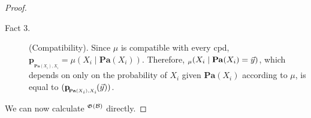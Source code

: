 \documentclass{article}
\theoremstyle{plain}
\theoremstyle{definition}
\theoremstyle{remark}
\let\H\relax
\DeclareMathOperator{\H}{\mathrm{H}} %
\newcommand\mat[1]{\mathbf{#1}}
\newcommand{\bp}[1][L]{\mat{p}_{\!_{#1}\!}}
\newcommand{\dg}[1]{\mathfrak{#1}}
\newcommand\Pa{\mathbf{Pa}}
\newcommand\Gib{\mathit{Gib}}
\newcommand\extrainfo[2][\dg M]{\Gib(#1,#2)}
\newcommand{\PDGof}[1]{\dg G(#1)}
\numberwithin{equation}{section}
\begin{document}
\begin{proof}
\begin{description}
			\item[Fact 3.] (Compatibility). Since $\mu$ is compatible with every cpd, $\bp[\Pa(X_i),X_i] = \mu(X_i \mid \Pa(X_i))$. Therefore, $\H_\mu(X_i \mid \Pa(X_i) = \vec y) $, which depends on only on the probability of $X_i$ given $\Pa(X_i)$ according to $\mu$, is equal to $\H(\bp[\Pa(X_i),X_i](\vec y))$. 
		\end{description}
		We can now calculate $\H^{\PDGof{\cal B}}$ directly.
		
		

\end{proof}
\end{document}
